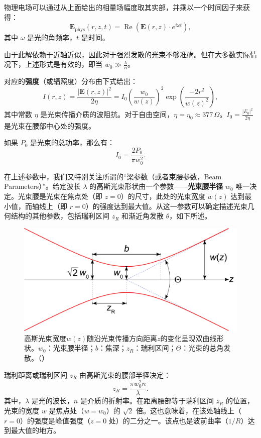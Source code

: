 \begin{enumerate}
\begin{enumerate}
\begin{itemize}
			物理电场可以通过从上面给出的相量场幅度取其实部，并乘以一个时间因子来获得：
			\[
			\mathbf{E}_\text{phys}(r,z,t) = \operatorname{Re} \left( \mathbf{E}(r,z) \cdot e^{i\omega t} \right),
			\]
			其中 $\omega$ 是光的角频率，$t$ 是时间。
			
			由于此解依赖于近轴近似，因此对于强烈发散的光束不够准确。但在大多数实际情况下，上述形式是有效的，即当 $w_0 \gg \frac{\lambda}{n}$。
			
			对应的\textbf{强度}（或辐照度）分布由下式给出：
			\[
			I(r, z) = \frac{|\mathbf{E}(r, z)|^2}{2 \eta} = I_0 \left( \frac{w_0}{w(z)} \right)^2 \exp \left( \frac{-2r^2}{w(z)^2} \right),
			\]
			其中常数 $\eta$ 是光束传播介质的波阻抗。对于自由空间，$\eta = \eta_0 \approx 377 \, \Omega$。$I_0 = \frac{|E_0|^2}{2 \eta}$ 是光束在腰部中心处的强度。
			
			如果 $P_0$ 是光束的总功率，那么有：
			\[
			I_0 = \frac{2 P_0}{\pi w_0^2}.
			\]
			
			在上述参数中，我们又特别关注所谓的“梁参数（或者束腰参数，Beam Parameters）”。给定波长 $\lambda$ 的高斯光束形状由一个参数——\textbf{光束腰半径} $w_0$ 唯一决定。光束腰是光束在焦点处（即 $z = 0$）的尺寸，此处的光束宽度 $w(z)$ 达到最小值，而轴线上（即 $r = 0$）的强度达到最大值。从这一参数可以确定描述光束几何结构的其他参数，包括瑞利区间 $z_R$ 和渐近角发散 $\theta$，如下所述。
			
			\begin{figure}[h]
				\centering
				\includegraphics[width=0.7\linewidth]{images/APL1_8_GaussianBeamWaist}
				\caption{高斯光束宽度$w(z)$随沿光束传播方向距离$z$的变化呈现双曲线形状。$w_0$：光束腰半径；$b$：焦深；$z_R$：瑞利区间；$\Theta$：光束的总角发散。（\cite{a}）}
				\label{fig:apl18gaussianbeamwaist}
			\end{figure}
			
			瑞利距离或瑞利区间 $z_R$ 由高斯光束的腰部半径决定：
			\[
			z_R = \frac{\pi w_0^2 n}{\lambda}.
			\]
			其中，$\lambda$ 是光的波长，$n$ 是介质的折射率。在距离腰部等于瑞利区间 $z_R$ 的位置，光束的宽度 $w$ 是焦点处（$w = w_0$）的 $\sqrt{2}$ 倍。这也意味着，在该处轴线上（$r = 0$）的强度是峰值强度（$z = 0$ 处）的二分之一。该点也是波前曲率（$1/R$）达到最大值的地方。
			

\end{itemize}
\end{enumerate}
\end{enumerate}
